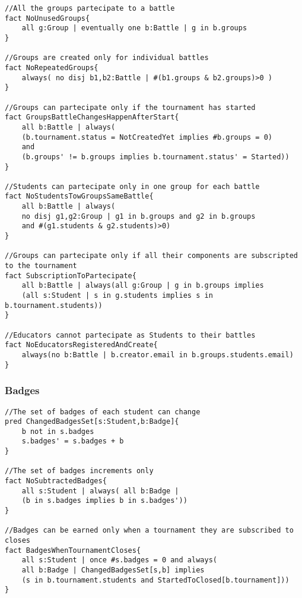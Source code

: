 \begin{verbatim}
//All the groups partecipate to a battle
fact NoUnusedGroups{
    all g:Group | eventually one b:Battle | g in b.groups
}

//Groups are created only for individual battles
fact NoRepeatedGroups{
    always( no disj b1,b2:Battle | #(b1.groups & b2.groups)>0 )
}

//Groups can partecipate only if the tournament has started
fact GroupsBattleChangesHappenAfterStart{
    all b:Battle | always(
    (b.tournament.status = NotCreatedYet implies #b.groups = 0)
    and
    (b.groups' != b.groups implies b.tournament.status' = Started))
}

//Students can partecipate only in one group for each battle
fact NoStudentsTowGroupsSameBattle{
    all b:Battle | always(
    no disj g1,g2:Group | g1 in b.groups and g2 in b.groups
    and #(g1.students & g2.students)>0)
}

//Groups can partecipate only if all their components are subscripted to the tournament
fact SubscriptionToPartecipate{
    all b:Battle | always(all g:Group | g in b.groups implies
    (all s:Student | s in g.students implies s in b.tournament.students))
}

//Educators cannot partecipate as Students to their battles
fact NoEducatorsRegisteredAndCreate{
    always(no b:Battle | b.creator.email in b.groups.students.email)
}
\end{verbatim}

\subsubsection{Badges}

\begin{verbatim}
//The set of badges of each student can change
pred ChangedBadgesSet[s:Student,b:Badge]{
    b not in s.badges
    s.badges' = s.badges + b
}

//The set of badges increments only
fact NoSubtractedBadges{
    all s:Student | always( all b:Badge |
    (b in s.badges implies b in s.badges'))
}

//Badges can be earned only when a tournament they are subscribed to closes
fact BadgesWhenTournamentCloses{
    all s:Student | once #s.badges = 0 and always(
    all b:Badge | ChangedBadgesSet[s,b] implies 
    (s in b.tournament.students and StartedToClosed[b.tournament]))
}
\end{verbatim}